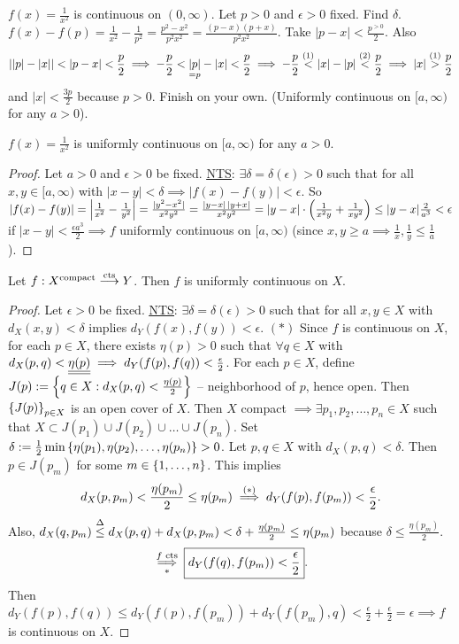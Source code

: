 \documentclass[]{article}
\begin{document}
\begin{example}
	$f(x) = \frac1{x^2}$ is continuous on \ul{$(0,\infty)$}.
	Let $p>0$ and $\epsilon>0$ fixed. Find $\delta$.
	$f(x)-f(p) = \frac1{x^2} - \frac1{p^2} = \frac{p^2-x^2}{p^2x^2} = \frac{(p-x)(p+x)}{p^2x^2}$.
	Take $|p-x|<\frac{p^{>0}}2$. Also $$\mlr{|p|-|x|}<|p-x|<\frac p2 \implies -\frac p2 < \us{=p}{|p|}-|x| < \frac p2 \implies -\frac p2 \os{(1)}< |x|-|p| \os{(2)}< \frac p2 \implies |x|\os{(1)}>\frac p2$$ and $|x|<\frac{3p}2$ because $p>0$.
	Finish on your own. (Uniformly continuous on $[a,\infty)$ for any $a>0$).
\end{example}

\newpage

\begin{example}
	$f(x) = \frac1{x^2}$ is uniformly continuous on $[a,\infty)$ for any $a>0$.
\end{example}
\begin{proof}
	Let $a>0$ and $\epsilon>0$ be fixed.
	\ul{\ul{NTS}}: $\exists\delta=\delta(\epsilon)>0$ such that for all $x,y\in[a,\infty)$ with $|x-y|<\delta\implies |f(x)-f(y)|<\epsilon$.
	So $|f(x)-f(y)| = \left|\frac1{x^2}-\frac1{y^2}\right| = \frac{|y^2-x^2|}{x^2y^2} = \frac{|y-x|\,|y+x|}{x^2y^2} = |y-x|\cdot\left(\frac 1{x^2y}+\frac1{xy^2}\right) \leq |y-x|\frac2{a^3}<\epsilon$ if $|x-y|<\frac{\epsilon a^3}2 \implies f$ uniformly continuous on $[a,\infty)$ (since $x,y\geq a\implies \frac1x,\frac1y\leq\frac1a$).
\end{proof}

\begin{theorem}
	Let $f:X^\text{compact}\overset{\text{cts}}{\longrightarrow}Y$.
	Then $f$ is uniformly continuous on $X$.
\end{theorem}
\begin{proof}
	Let $\epsilon>0$ be fixed.
	\ul{\ul{NTS}}: $\exists\delta=\delta(\epsilon)>0$ such that for all $x,y\in X$ with $d_X(x,y)<\delta$ implies $d_Y(f(x),f(y))<\epsilon$.
	$(*)$ Since $f$ is continuous on $X$, for each $p\in X$, there exists $\eta(p)>0$ such that $\forall q\in X$ with $d_X(p,q)<\underline{\underline{\eta(p)}} \implies d_Y(f(p),f(q))<\frac\epsilon2$.
	For each $p\in X$, define $J(p):=\left\{ q\in X : d_X(p,q) < \frac{\eta(p)}2 \right\}$ -- neighborhood of $p$, hence open.
	Then $\left\{ J(p) \right\}_{p\in X}$ is an open cover of $X$.
	Then $X$ compact $\implies \exists p_1,p_2,\dots,p_n\in X$ such that $X \subset J(p_1)\cup J(p_2)\cup\dots\cup J(p_n)$.
	Set $\delta:=\frac12\min\left\{ \eta(p_1),\eta(p_2),\dots,\eta(p_n) \right\}>0$.
	Let $p,q\in X$ with $d_X(p,q)<\delta$.
	Then $p\in J(p_m)$ for some $m\in\left\{ 1,\dots,n \right\}$.
	This implies $$d_X(p,p_m)<\frac{\eta(p_m)}2 \leq \eta(p_m) \overset{(*)}{\implies} d_Y(f(p),f(p_m)) < \frac\epsilon2.$$
	Also, $d_X(q,p_m) \overset{\Delta}{\leq} d_X(p,q) + d_X(p,p_m) < \delta + \frac{\eta(p_m)}2 \leq \eta(p_m)$ because $\delta \leq \frac{\eta(p_m)}2$.
	$$\underset{*}{\overset{f\text{ cts}}{\implies}} \fbox{$\displaystyle d_Y(f(q),f(p_m)) < \frac\epsilon2$}.$$
	Then $d_Y(f(p),f(q)) \leq d_Y(f(p),f(p_m)) + d_Y(f(p_m),q) < \frac\epsilon2+\frac\epsilon2 = \epsilon \implies f$ is continuous on $X$.
\end{proof}
\end{document}
